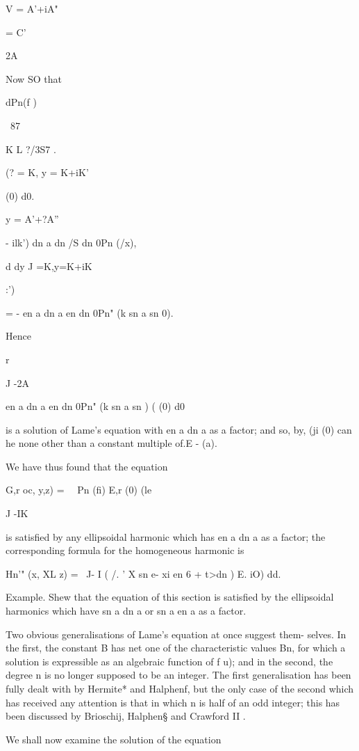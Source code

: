 {{{{{{{{V = A'+iA"

= C'

2A

Now SO that

dPn(f )

\ 87 \

K L ?/3S7 .

(? = K, y = K+iK'

(0) d0.

y = A'+?A''

- ilk') dn a dn /S dn 0Pn (/x),

d dy J =K,y=K+iK

:')

= - en a dn a en dn 0Pn" (k sn a sn 0).

Hence

r

J -2A

en a dn a en dn 0Pn" (k sn a sn ) ( (0) d0

is a solution of Lame's equation with en a dn a as a factor; and so,
by, (ji (0) can he none other than a constant multiple of.E -
(a).

%
%

We have thus found that the equation

G,r oc, y,z) = \ \ Pn (fi) E,r (0) (le

J -IK

is satisfied by any ellipsoidal harmonic which has en a dn a as a
factor; the corresponding formula for the homogeneous harmonic is

Hn'" (x, XL z) = \ J- I ( /. ' X sn e- xi en 6 + t>dn ) E. iO) dd.

Example. Shew that the equation of this section is satisfied by the
ellipsoidal harmonics which have sn a dn a or sn a en a as a factor.


Two obvious generalisations of Lame's equation at once suggest them-
selves. In the first, the constant B has net one of the characteristic
values Bn, for which a solution is expressible as an algebraic
function of f u); and in the second, the degree n is no longer
supposed to be an integer. The first generalisation has been fully
dealt with by Hermite* and Halphenf, but the only case of the second
which has received any attention is that in which n is half of an odd
integer; this has been discussed by Brioschij, Halphen§ and Crawford
II .

We shall now examine the solution of the equation

}}}}}}}}
